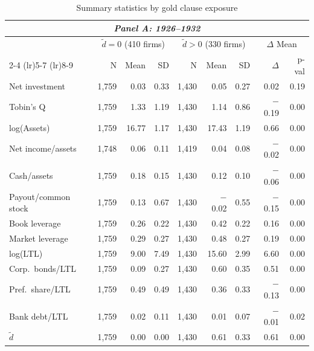 \begin{table}[p]\centering
    \caption{\\ Summary statistics by gold clause exposure}
    \scriptsize
    \label{tab:sum_stats_tilde_d}
    
    \begin{threeparttable}
        \begin{tabular}{l rrr rrr rr}
            \toprule
            \multicolumn{9}{c}{\textit{Panel A: 1926--1932}} \\
            \midrule
             & \multicolumn{3}{c}{$\tilde{d} = 0$ (410 firms)} & \multicolumn{3}{c}{$\tilde{d} > 0$ (330 firms)} & \multicolumn{2}{c}{$\Delta$ Mean} \\
            \cmidrule(lr){2-4} \cmidrule(lr){5-7} \cmidrule(lr){8-9}
             & N & Mean & SD & N & Mean & SD & $\Delta$ & p-val \\
            Net investment & 1,759 & 0.03 & 0.33 & 1,430 & 0.05 & 0.27 & 0.02 & 0.19 \\
            Tobin's Q & 1,759 & 1.33 & 1.19 & 1,430 & 1.14 & 0.86 & $-$0.19 & 0.00 \\
            log(Assets) & 1,759 & 16.77 & 1.17 & 1,430 & 17.43 & 1.19 & 0.66 & 0.00 \\
            Net income/assets & 1,748 & 0.06 & 0.11 & 1,419 & 0.04 & 0.08 & $-$0.02 & 0.00 \\
            Cash/assets & 1,759 & 0.18 & 0.15 & 1,430 & 0.12 & 0.10 & $-$0.06 & 0.00 \\
            Payout/common stock & 1,759 & 0.13 & 0.67 & 1,430 & $-$0.02 & 0.55 & $-$0.15 & 0.00 \\
            Book leverage & 1,759 & 0.26 & 0.22 & 1,430 & 0.42 & 0.22 & 0.16 & 0.00 \\
            Market leverage & 1,759 & 0.29 & 0.27 & 1,430 & 0.48 & 0.27 & 0.19 & 0.00 \\
            log(LTL) & 1,759 & 9.00 & 7.49 & 1,430 & 15.60 & 2.99 & 6.60 & 0.00 \\
            Corp.\ bonds/LTL & 1,759 & 0.09 & 0.27 & 1,430 & 0.60 & 0.35 & 0.51 & 0.00 \\
            Pref.\ share/LTL & 1,759 & 0.49 & 0.49 & 1,430 & 0.36 & 0.33 & $-$0.13 & 0.00 \\
            Bank debt/LTL & 1,759 & 0.02 & 0.11 & 1,430 & 0.01 & 0.07 & $-$0.01 & 0.02 \\
            \ensuremath{\tilde{d}} & 1,759 & 0.00 & 0.00 & 1,430 & 0.61 & 0.33 & 0.61 & 0.00 \\

\end{tabular}
\end{threeparttable}
\end{table}

